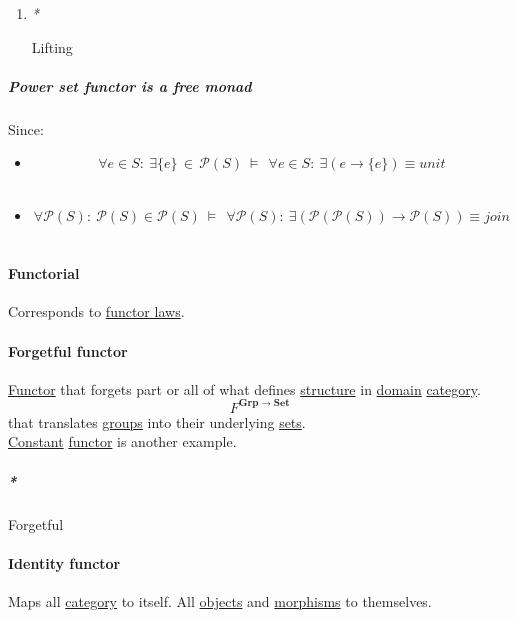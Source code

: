 \documentclass[11pt]{article}
\begin{document}
\begin{enumerate}
\item \emph{*}
\label{sec:org2d7a4e8}

\label{org1674a1b}Lifting\\
\end{enumerate}

\subparagraph{\label{org2a9fc3a}Power set functor is a free monad}
\label{sec:orge3c2f38}
Since:\\
\begin{itemize}
\item $$ \forall e \in S : \ \exists \{e\} \, \in \, {\mathcal{P}(S)} \ \vDash \ \ \forall e \in S : \ \exists (e \to \{e\}) \equiv unit $$\\
\item $$ \forall \mathcal{P}(S) : \ \mathcal{P}(S) \in \mathcal{P}(S) \ \vDash \ \ \forall \mathcal{P}(S) : \ \exists (\mathcal{P}(\mathcal{P}(S)) \to \mathcal{P}(S)) \equiv join $$\\
\end{itemize}

\paragraph{\label{org8ac5764}Functorial}
\label{sec:orgca79ef1}
Corresponds to \hyperref[org6ae8c48]{functor laws}.\\

\paragraph{\label{org882aae3}Forgetful functor}
\label{sec:orgc052402}
\hyperref[org6073683]{Functor} that forgets part or all of what defines \hyperref[org93ee82c]{structure} in \hyperref[orgf784585]{domain} \hyperref[org3e3a79b]{category}.\\
$$ F^{\mathbf {Grp} \to \mathbf {Set}} $$ that translates \hyperref[org7292335]{groups} into their underlying \hyperref[org4e7443a]{sets}.\\
\hyperref[org6cc4f99]{Constant} \hyperref[org6073683]{functor} is another example.\\

\subparagraph{\emph{*}}
\label{sec:orgd50b0f5}

\label{orga913e66}Forgetful\\

\paragraph{\label{orgd84429d}Identity functor}
\label{sec:org3b4fb66}
Maps all \hyperref[org3e3a79b]{category} to itself. All \hyperref[orge0f000f]{objects} and \hyperref[org8ed0ce8]{morphisms} to themselves.\\
\end{document}
